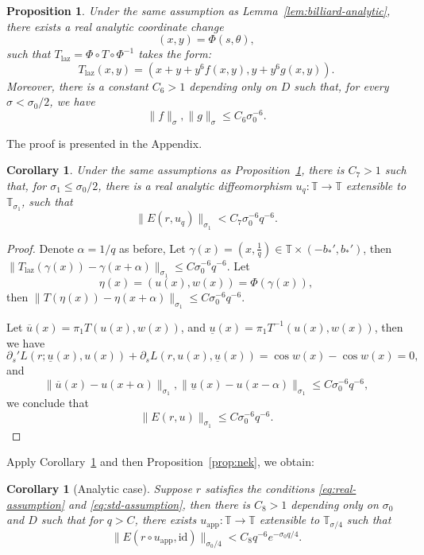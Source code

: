 \documentclass[12pt,reqno]{amsart}
\newtheorem{prop}[thm]{Proposition}
\newtheorem{cor}[thm]{Corollary}
\theoremstyle{remark}
\begin{document}
\begin{prop}\label{prop:gen-laz}
Under the same assumption as Lemma~\ref{lem:billiard-analytic}, there exists a real analytic coordinate change 
\[
	(x, y) = \Phi(s, \theta) , 
\]
such that $T_{\mathrm{laz}} = \Phi \circ T \circ \Phi^{-1}$ takes the form:
\[
	T_{\mathrm{laz}}(x, y) = (x + y + y^6 f(x, y), y + y^6 g(x, y)). 
\]
Moreover, there is a constant $C_6>1$ depending only on $D$ such that, for every $\sigma < \sigma_0/2$, we have 
\[
	\|f\|_{\sigma}, \|g\|_{\sigma} \le C_6 \sigma_0^{-6} . 
\]
\end{prop}
The proof is presented in the Appendix. 

\begin{cor}\label{cor:appox-general}
Under the same assumptions as Proposition~\ref{prop:gen-laz}, there is $C_7 > 1$ such that, for $\sigma_1 \le  \sigma_0/2$,  there is a real analytic diffeomorphism  $u_q: {\mathbb{T}} \to {\mathbb{T}}$ extensible to ${\mathbb{T}}_{\sigma_1}$, such that 
\[
	\|E(r, u_q)\|_{\sigma_1} < C_7 \sigma_0^{-6} q^{-6}. 
\]
\end{cor}
\begin{proof}
Denote $\alpha = 1/q$ as before, 
Let $\gamma(x) = (x, \frac{1}{q}) \in {\mathbb{T}} \times (-b_*', b_*')$, then $\|T_{\mathrm{laz}}(\gamma(x)) - \gamma(x + \alpha)\|_{\sigma_1} \le C \sigma_0^{-6} q^{-6}$. Let 
\[
	\eta(x) = (u(x), w(x)) = \Phi(\gamma(x)),  
\]
then $\|T(\eta(x)) - \eta(x+\alpha)\|_{\sigma_1} \le C \sigma_0^{-6} q^{-6}$. 

Let ${\overline{u}}(x) = \pi_1 T(u(x), w(x))$, and ${\underline{u}}(x) = \pi_1 T^{-1}(u(x), w(x))$, then we have 
\[
	\partial_s' L(r; {\underline{u}}(x), u(x)) + \partial_s L(r, u(x), {\underline{u}}(x)) = \cos w(x) - \cos w(x) = 0 , 
\]
and 
\[
	\|{\overline{u}}(x) - u(x + \alpha)\|_{\sigma_1}, \|{\underline{u}}(x) - u(x -\alpha)\|_{\sigma_1} \le C \sigma_0^{-6}q^{-6}, 
\]
we conclude that  
\[
	\|E(r, u)\|_{\sigma_1} \le C \sigma_0^{-6} q^{-6}. 
\]
\end{proof}

Apply Corollary~\ref{cor:appox-general} and then Proposition~\ref{prop:nek}, we obtain:
\begin{cor}
[Analytic case] \label{cor:app-analytic}
Suppose $r$ satisfies the conditions \eqref{eq:real-assumption} and \eqref{eq:std-assumption}, then there is $C_8 > 1$ depending only on $\sigma_0$ and $D$ such that for $q > C$, there exists $u_{\mathrm{app}}: {\mathbb{T}} \to {\mathbb{T}}$ extensible to ${\mathbb{T}}_{\sigma/4}$ such that
\[
	\|E(r \circ u_{\mathrm{app}}, {\mathrm{id}})\|_{\sigma_0/4} <  C_8 q^{-6} e^{- \sigma_0 q/ 4}. 
\] 
\end{cor}
\end{document}
